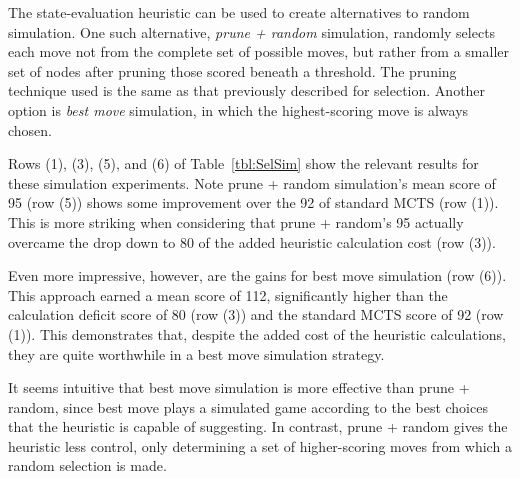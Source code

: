 \documentclass[letterpaper]{article}
\begin{document}

The state-evaluation heuristic can be used to create alternatives to random simulation. One such alternative, {\it prune + random} simulation, randomly selects each move not from the complete set of possible moves, but rather from a smaller set of nodes after pruning those scored beneath a threshold. The pruning technique used is the same as that previously described for selection. Another option is {\it best move} simulation, in which the highest-scoring move is always chosen.

Rows (1), (3), (5), and (6) of Table~\ref{tbl:SelSim} show the relevant results for these simulation experiments. Note prune + random simulation's mean score of 95 (row (5)) shows some improvement over the 92 of standard MCTS (row (1)). This is more striking when considering that prune + random's 95 actually overcame the drop down to 80 of the added heuristic calculation cost (row (3)).

Even more impressive, however, are the gains for best move simulation (row (6)). This approach earned a mean score of 112, significantly higher than the calculation deficit score of 80 (row (3)) and the standard MCTS score of 92 (row (1)). This demonstrates that, despite the added cost of the heuristic calculations, they are quite worthwhile in a best move simulation strategy.

It seems intuitive that best move simulation is more effective than prune + random, since best move plays a simulated game according to the best choices that the heuristic is capable of suggesting. In contrast, prune + random gives the heuristic less control, only determining a set of higher-scoring moves from which a random selection is made.

\end{document}
